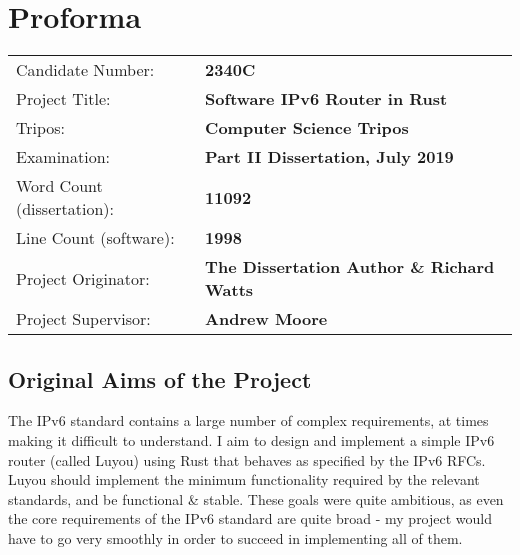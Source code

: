 \documentclass[12pt,a4paper,twoside,openany]{report}
\begin{document}

\pagestyle{plain}

\chapter*{Proforma}

{\large
\begin{tabular}{ll}
Candidate Number:          & \bf 2340C                      \\
Project Title:             & \bf Software IPv6 Router in Rust \\
Tripos:                    & \bf Computer Science Tripos  \\
Examination:               & \bf Part II Dissertation, July 2019  \\
Word Count (dissertation): & \bf 11092\footnotemark[1]  \\
Line Count (software):     & \bf 1998\footnotemark[2] \\
Project Originator:        & \bf The Dissertation Author \& Richard Watts \\
Project Supervisor:        & \bf Andrew Moore \\
\end{tabular}
}



\section*{Original Aims of the Project}

The IPv6 standard\cite{ipv6_rfc} contains a large number of complex requirements, at times making it difficult to understand. I aim to design and implement a simple IPv6 router (called Luyou) using Rust\cite{rust} that behaves as specified by the IPv6 RFCs. Luyou should implement the minimum functionality required by the relevant standards, and be functional \&  stable.  These goals were quite ambitious, as even the core requirements of the IPv6 standard are quite broad - my project would have to go very smoothly in order to succeed in implementing all of them.
\end{document}

